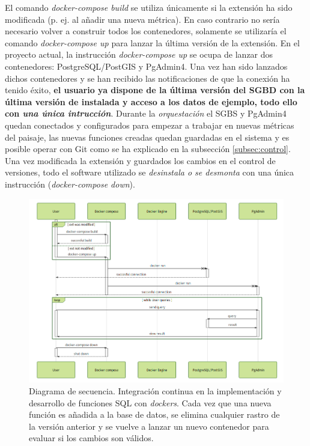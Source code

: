 El comando \textit{docker-compose build} se utiliza únicamente si la extensión ha sido modificada (p. ej. al añadir una nueva métrica). En caso contrario no sería necesario volver a construir todos los contenedores, solamente se utilizaría el comando \textit{docker-compose up} para lanzar la última versión de la extensión. En el proyecto actual, la instrucción \textit{docker-compose up} se ocupa de lanzar dos contenedores: PostgreSQL/PostGIS y PgAdmin4. Una vez han sido lanzados dichos contenedores y se han recibido las notificaciones de que la conexión ha tenido éxito, \textbf{el usuario ya dispone de la última versión del SGBD con la última versión de \pgland{} instalada y acceso a los datos de ejemplo, todo ello con \textit{una única intrucción}}. Durante la \textit{orquestación} el SGBS y PgAdmin4 quedan conectados y configurados para empezar a trabajar en nuevas métricas del paisaje, las nuevas funciones creadas quedan guardadas en el sistema y es posible operar con Git como se ha explicado en la subsección \ref{subsec:control}. Una vez modificada la extensión y guardados los cambios en el control de versiones, todo el software utilizado se \textit{desinstala o se desmonta} con una única instrucción (\textit{docker-compose down}).

\begin{figure}
\begin{center}
\includegraphics[width=\textwidth]{Metodologia/Figs/ci.png}
\caption{Diagrama de secuencia. Integración continua en la implementación y desarrollo de funciones SQL con \textit{dockers}. Cada vez que una nueva función es añadida a la base de datos, se elimina cualquier rastro de la versión anterior y se vuelve a lanzar un nuevo contenedor para evaluar si los cambios son válidos. \label{fig:ci}}
\end{center}
\end{figure}


